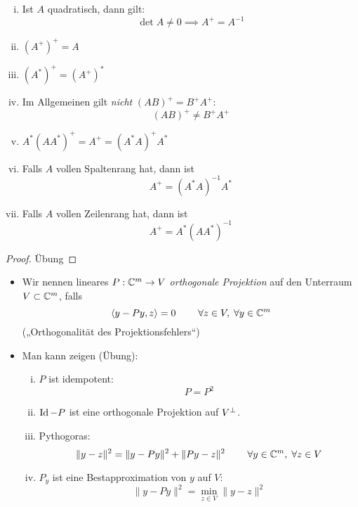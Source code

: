 \documentclass[
]{mycourse}
\begin{document}
\begin{st}[Eigenschaften]
	\label{1.41}
	\begin{enumerate}[i)]
		\item
			Ist $A$ quadratisch, dann gilt:
			\[
				\det A \neq 0 \implies A^+ = A^{-1}
			\]
		\item
			$(A^+)^+ = A$
		\item
			$(A^*)^+ = (A^+)^*$
		\item
			Im Allgemeinen gilt \emph{nicht} $(AB)^+ = B^+A^+$:
			\[
				(AB)^+ \neq B^+A^+
			\]
		\item
			$A^*(AA^*)^+ = A^+ = (A^*A)^+ A^*$
		\item
			Falls $A$ vollen Spaltenrang hat, dann ist
			\[
				A^+ = (A^*A)^{-1}A^*
			\]
		\item
			Falls $A$ vollen Zeilenrang hat, dann ist
			\[
				A^+ = A^*(AA^*)^{-1}
			\]
	\end{enumerate}
	\begin{proof}
		Übung
	\end{proof}
\end{st}

\begin{nt*}
	\begin{itemize}
		\item
			Wir nennen lineares $P: \mathbb{C}^m \to V$ \emph{orthogonale Projektion} auf den Unterraum $V\subset \mathbb{C}^m$, falls
			\[
				\<y- Py,z\> = 0 \qquad \forall z\in V, \forall y\in \C^m
			\]
			(„Orthogonalität des Projektionsfehlers“)
		\item
			Man kann zeigen (Übung):
			\begin{enumerate}[i)]
				\item
					$P$ ist idempotent:
					\[
						P = P^2
					\]
				\item
					$\operatorname{Id} - P$ ist eine orthogonale Projektion auf $V^\perp$.
				\item
					Pythogoras:
					\[
						\|y-z\|^2 = \|y-Py\|^2 + \|Py-z\|^2 
						\qquad \forall y\in \C^m,\forall z\in V
					\]
				\item
					$P_y$ ist eine Bestapproximation von $y$ auf $V$:
					\[
						\|y-Py\|^2 = \min_{z\in V}\|y-z\|^2
					\]
			\end{enumerate}
	\end{itemize}
\end{nt*}
\end{document}
